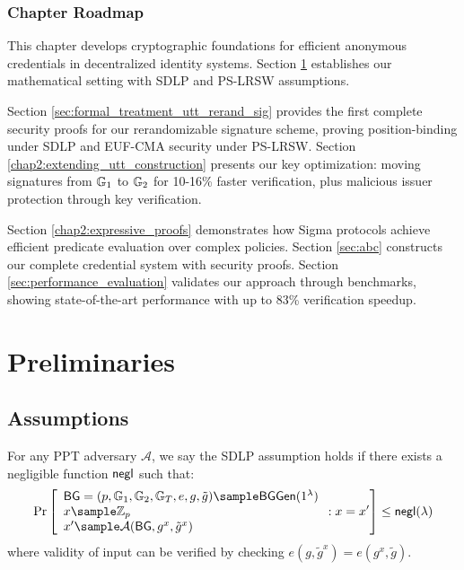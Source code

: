 \subsubsection*{Chapter Roadmap}
This chapter develops cryptographic foundations for efficient anonymous credentials in decentralized identity systems. Section \ref{chap2:preliminaries} establishes our mathematical setting with SDLP and PS-LRSW assumptions.

Section \ref{sec:formal_treatment_utt_rerand_sig} provides the first complete security proofs for our rerandomizable signature scheme, proving position-binding under SDLP and EUF-CMA security under PS-LRSW. Section \ref{chap2:extending_utt_construction} presents our key optimization: moving signatures from $\mathbb{G}_1$ to $\mathbb{G}_2$ for 10-16\% faster verification, plus malicious issuer protection through key verification.

Section \ref{chap2:expressive_proofs} demonstrates how Sigma protocols achieve efficient predicate evaluation over complex policies. Section \ref{sec:abc} constructs our complete credential system with security proofs. Section \ref{sec:performance_evaluation} validates our approach through benchmarks, showing state-of-the-art performance with up to 83\% verification speedup.






\section{Preliminaries}\label{chap2:preliminaries}


\subsection{Assumptions}


\begin{definition}\label{sdlp}
For any PPT adversary $\mathcal{A}$, we say the SDLP assumption holds if there exists a negligible function $\mathsf{negl}$ such that:
$$\Pr\left[\begin{array}{l}
    \BG = (p, \G_1, \G_2, \G_T, e, g, \tilde{g}) \sample \BGGen(1^\lambda) \\
    x \sample \Z_p \\
    x' \sample \mathcal{A}(\BG, g^x, \tilde{g}^x)
\end{array} : x = x'\right] \leq \negl(\lambda)$$
where validity of input can be verified by checking $e(g, \tilde{g}^x) = e(g^x, \tilde{g})$.
\end{definition} 


